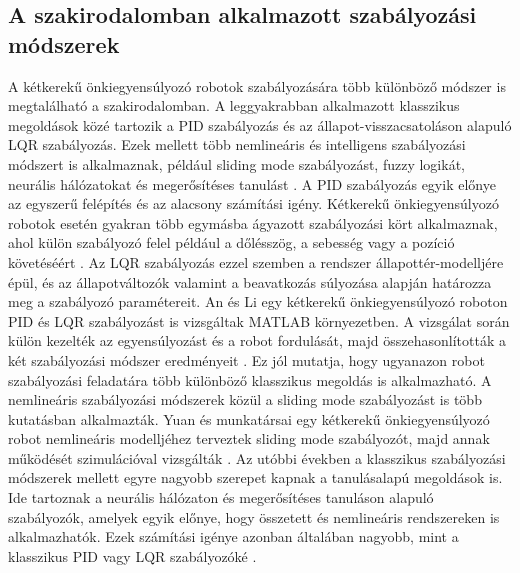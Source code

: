 \documentclass[12pt,a4paper]{report}
\begin{document}
	\subsection{A szakirodalomban alkalmazott szabályozási módszerek}
	A kétkerekű önkiegyensúlyozó robotok szabályozására több különböző módszer is megtalálható a szakirodalomban. A leggyakrabban alkalmazott klasszikus megoldások közé tartozik a PID szabályozás és az állapot-visszacsatoláson alapuló LQR szabályozás. Ezek mellett több nemlineáris és intelligens szabályozási módszert is alkalmaznak, például sliding mode szabályozást, fuzzy logikát, neurális hálózatokat és megerősítéses tanulást \cite{chan2013,zhangnor2025}.
	\newline
	\newline
	A PID szabályozás egyik előnye az egyszerű felépítés és az alacsony számítási igény. Kétkerekű önkiegyensúlyozó robotok esetén gyakran több egymásba ágyazott szabályozási kört alkalmaznak, ahol külön szabályozó felel például a dőlésszög, a sebesség vagy a pozíció követéséért \cite{zhangnor2025}. Az LQR szabályozás ezzel szemben a rendszer állapottér-modelljére épül, és az állapotváltozók valamint a beavatkozás súlyozása alapján határozza meg a szabályozó paramétereit.
	\newline
	\newline
	An és Li egy kétkerekű önkiegyensúlyozó roboton PID és LQR szabályozást is vizsgáltak MATLAB környezetben. A vizsgálat során külön kezelték az egyensúlyozást és a robot fordulását, majd összehasonlították a két szabályozási módszer eredményeit \cite{anli2013}. Ez jól mutatja, hogy ugyanazon robot szabályozási feladatára több különböző klasszikus megoldás is alkalmazható.
	\newline
	\newline
	A nemlineáris szabályozási módszerek közül a sliding mode szabályozást is több kutatásban alkalmazták. Yuan és munkatársai egy kétkerekű önkiegyensúlyozó robot nemlineáris modelljéhez terveztek sliding mode szabályozót, majd annak működését szimulációval vizsgálták \cite{yuan2016}.
	\newline
	\newline
	Az utóbbi években a klasszikus szabályozási módszerek mellett egyre nagyobb szerepet kapnak a tanulásalapú megoldások is. Ide tartoznak a neurális hálózaton és megerősítéses tanuláson alapuló szabályozók, amelyek egyik előnye, hogy összetett és nemlineáris rendszereken is alkalmazhatók. Ezek számítási igénye azonban általában nagyobb, mint a klasszikus PID vagy LQR szabályozóké \cite{zhangnor2025}.
	
\end{document}
